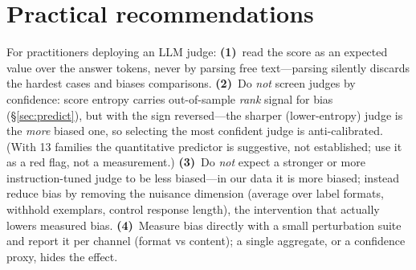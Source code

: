 \documentclass[11pt]{article}
\begin{document}
\section{Practical recommendations}\label{app:practice}
For practitioners deploying an LLM judge: \textbf{(1)}~read the score as an expected
value over the answer tokens, never by parsing free text---parsing silently discards the
hardest cases and biases comparisons. \textbf{(2)}~Do \emph{not} screen judges by
confidence: score entropy carries out-of-sample \emph{rank} signal for bias
(\S\ref{sec:predict}), but with the sign reversed---the sharper (lower-entropy)
judge is the \emph{more} biased one, so selecting the most confident judge is
anti-calibrated. (With 13 families the quantitative predictor is suggestive, not
established; use it as a red flag, not a measurement.) \textbf{(3)}~Do \emph{not} expect a
stronger or more instruction-tuned judge to be less biased---in our data it is more
biased; instead reduce bias by removing the nuisance dimension (average over label
formats, withhold exemplars, control response length), the intervention that actually
lowers measured bias. \textbf{(4)}~Measure bias directly with a small perturbation suite
and report it per channel (format vs content); a single aggregate, or a confidence proxy,
hides the effect.



\end{document}
